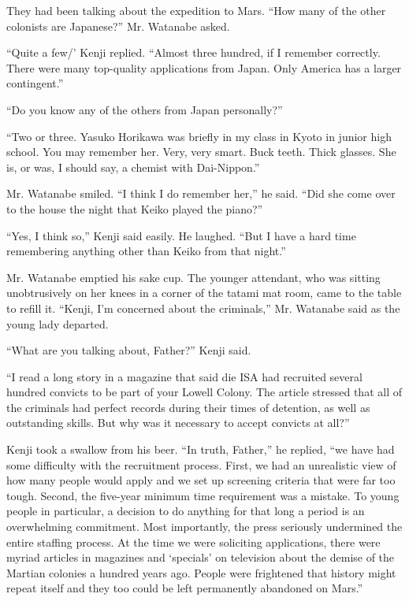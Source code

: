 \documentclass[]{article}
\begin{document}
{They had been talking about the expedition to Mars. “How many of the other colonists are Japanese?” Mr. Watanabe asked.

“Quite a few/’ Kenji replied. “Almost three hundred, if I remember correctly. There were many top-quality applications from Japan. Only America has a larger contingent.”

“Do you know any of the others from Japan personally?”

“Two or three. Yasuko Horikawa was briefly in my class in Kyoto in junior high school. You may remember her. Very, very smart. Buck teeth. Thick glasses. She is, or was, I should say, a chemist with Dai-Nippon.”

Mr. Watanabe smiled. “I think I do remember her,” he said. “Did she come over to the house the night that Keiko played the piano?”

“Yes, I think so,” Kenji said easily. He laughed. “But I have a hard time remembering anything other than Keiko from that night.”

Mr. Watanabe emptied his sake cup. The younger attendant, who was sitting unobtrusively on her knees in a corner of the tatami mat room, came to the table to refill it. “Kenji, I’m concerned about the criminals,” Mr. Watanabe said as the young lady departed.

“What are you talking about, Father?” Kenji said.

“I read a long story in a magazine that said die ISA had recruited several hundred convicts to be part of your Lowell Colony. The article stressed that all of the criminals had perfect records during their times of detention, as well as outstanding skills. But why was it necessary to accept convicts at all?”

Kenji took a swallow from his beer. “In truth, Father,” he replied, “we have had some difficulty with the recruitment process. First, we had an unrealistic view of how many people would apply and we set up screening criteria that were far too tough. Second, the five-year minimum time requirement was a mistake. To young people in particular, a decision to do anything for that long a period is an overwhelming commitment. Most importantly, the press seriously undermined the entire staffing process. At the time we were soliciting applications, there were myriad articles in magazines and ‘specials’ on television about the demise of the Martian colonies a hundred years ago. People were frightened that history might repeat itself and they too could be left permanently abandoned on Mars.”

}
\end{document}
